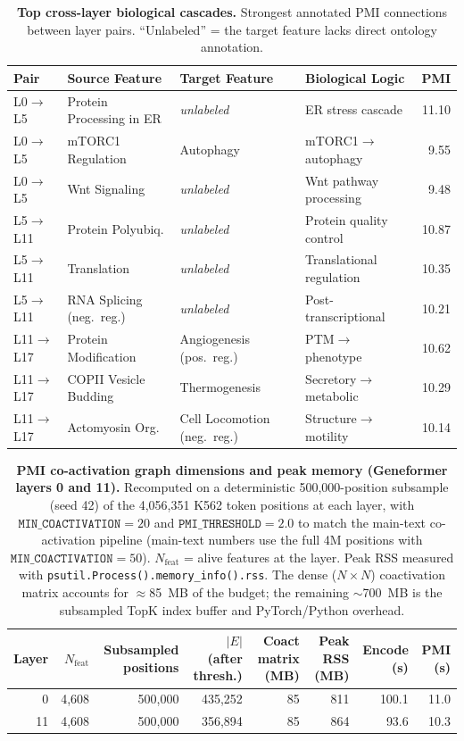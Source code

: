 \documentclass[11pt]{article}
\begin{document}
\begin{table}[H]
\centering
\caption{\textbf{Top cross-layer biological cascades.} Strongest annotated PMI connections between layer pairs. ``Unlabeled'' = the target feature lacks direct ontology annotation.}
\label{tab:cascades}
\smallskip
\small
\begin{tabular}{lp{2.6cm}p{2.6cm}p{3.2cm}r}
\toprule
Pair & Source Feature & Target Feature & Biological Logic & PMI \\
\midrule
L0$\to$L5  & Protein Processing in ER & \textit{unlabeled} & ER stress cascade & 11.10 \\
L0$\to$L5  & mTORC1 Regulation & Autophagy & mTORC1$\to$autophagy & 9.55 \\
L0$\to$L5  & Wnt Signaling & \textit{unlabeled} & Wnt pathway processing & 9.48 \\
\midrule
L5$\to$L11 & Protein Polyubiq. & \textit{unlabeled} & Protein quality control & 10.87 \\
L5$\to$L11 & Translation & \textit{unlabeled} & Translational regulation & 10.35 \\
L5$\to$L11 & RNA Splicing (neg.\ reg.) & \textit{unlabeled} & Post-transcriptional & 10.21 \\
\midrule
L11$\to$L17 & Protein Modification & Angiogenesis (pos.\ reg.) & PTM$\to$phenotype & 10.62 \\
L11$\to$L17 & COPII Vesicle Budding & Thermogenesis & Secretory$\to$metabolic & 10.29 \\
L11$\to$L17 & Actomyosin Org. & Cell Locomotion (neg.\ reg.) & Structure$\to$motility & 10.14 \\
\bottomrule
\end{tabular}
\end{table}

\begin{table}[H]
\centering
\caption{\textbf{PMI co-activation graph dimensions and peak memory (Geneformer layers 0 and 11).} Recomputed on a deterministic 500{,}000-position subsample (seed 42) of the 4{,}056{,}351 K562 token positions at each layer, with $\texttt{MIN\_COACTIVATION}{=}20$ and $\texttt{PMI\_THRESHOLD}{=}2.0$ to match the main-text co-activation pipeline (main-text numbers use the full 4M positions with $\texttt{MIN\_COACTIVATION}{=}50$). $N_\text{feat}$ = alive features at the layer. Peak RSS measured with \texttt{psutil.Process().memory\_info().rss}. The dense ($N{\times}N$) coactivation matrix accounts for $\approx$85~MB of the budget; the remaining $\sim$700~MB is the subsampled TopK index buffer and PyTorch/Python overhead.}
\label{tab:pmi_memory}
\smallskip
\small
\begin{tabular}{rrrrrrrr}
\toprule
Layer & $N_\text{feat}$ & Subsampled positions & $|E|$ (after thresh.) & Coact matrix (MB) & Peak RSS (MB) & Encode (s) & PMI (s) \\
\midrule
0  & 4{,}608 & 500{,}000 & 435{,}252 & 85 & 811 & 100.1 & 11.0 \\
11 & 4{,}608 & 500{,}000 & 356{,}894 & 85 & 864 &  93.6 & 10.3 \\
\bottomrule
\end{tabular}
\end{table}
\end{document}
